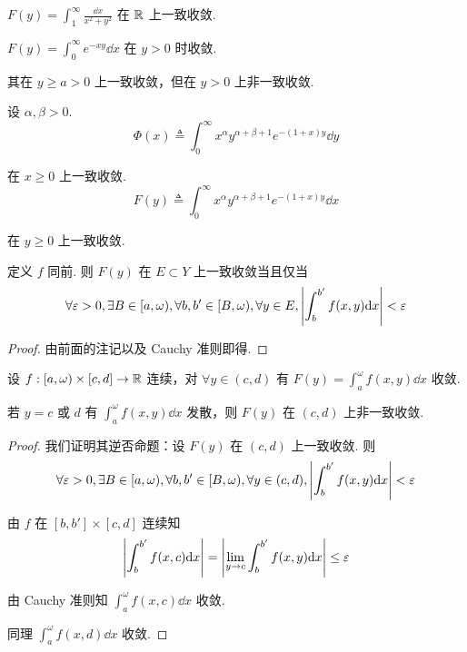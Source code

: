 \begin{example}
    $F(y)=\displaystyle\int_1^\infty\frac{\dd x}{x^2+y^2}$ 在 $\mathbb{R}$ 上一致收敛.
\end{example}

\begin{example}
    $F(y)=\displaystyle\int_0^\infty e^{-xy}\dd x$ 在 $y>0$ 时收敛.

    其在 $y\ge a>0$ 上一致收敛，但在 $y>0$ 上非一致收敛.
\end{example}

\begin{example}
    设 $\alpha,\beta>0$.
$$
\Phi(x)\triangleq\int_0^\infty x^\alpha y^{\alpha+\beta+1}e^{-(1+x)y}\dd y
$$

    在 $x\ge 0$ 上一致收敛.
$$
F(y)\triangleq\int_0^\infty x^\alpha y^{\alpha+\beta+1}e^{-(1+x)y}\dd x
$$

    在 $y\ge 0$ 上一致收敛.
\end{example}


\begin{property}
    定义 $f$ 同前. 则 $F(y)$ 在 $E\subset Y$ 上一致收敛当且仅当
$$
\forall\varepsilon>0,\exists B\in [a,\omega),\forall b,b'\in[B,\omega),\forall y\in E,\left\lvert{\int_b^{b'}f(x,y)\mathrm{d}x}\right\rvert<\varepsilon
$$
\end{property}
\begin{proof}
    由前面的注记以及 Cauchy 准则即得.
\end{proof}

\begin{inference}
    设 $f:[a,\omega)\times[c,d]\to\mathbb{R}$ 连续，对 $\forall y\in(c,d)$ 有 $F(y)=\displaystyle\int_a^\omega f(x,y)\dd x$ 收敛.

    若 $y=c$ 或 $d$ 有 $\int_a^\omega f(x,y)\dd x$ 发散，则 $F(y)$ 在 $(c,d)$ 上非一致收敛.
\end{inference}
\begin{proof}
    我们证明其逆否命题：设 $F(y)$ 在 $(c,d)$ 上一致收敛. 则
$$
\forall\varepsilon>0,\exists B\in[a,\omega),\forall b,b'\in[B,\omega),\forall y\in(c,d),\left\lvert{\int_b^{b'}f(x,y)\mathrm{d}x}\right\rvert<\varepsilon
$$

    由 $f$ 在 $[b,b']\times [c,d]$ 连续知
$$
\left\lvert{\int_b^{b'}f(x,c)\mathrm{d}x}\right\rvert=\left\lvert{\lim_{y\to c}\int_b^{b'}f(x,y)\mathrm{d}x}\right\rvert\le\varepsilon
$$

    由 Cauchy 准则知 $\displaystyle\int_a^\omega f(x,c)\dd x$ 收敛.

    同理 $\displaystyle\int_a^\omega f(x,d)\dd x$ 收敛.
\end{proof}

